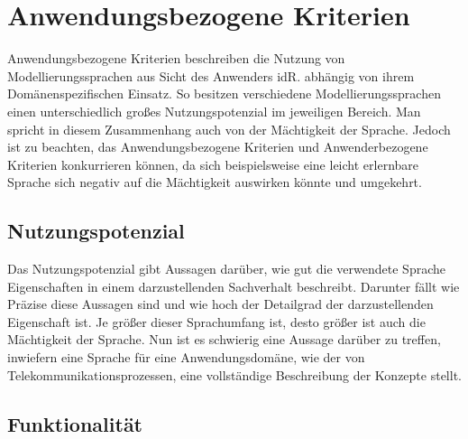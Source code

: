 \section{Anwendungsbezogene Kriterien}
\label{sc:AnwendungsbezogeneKriterien}
Anwendungsbezogene Kriterien beschreiben die Nutzung von Modellierungssprachen aus Sicht des Anwenders idR. abhängig 
von ihrem Domänenspezifischen Einsatz. So besitzen verschiedene Modellierungssprachen einen unterschiedlich großes 
Nutzungspotenzial im jeweiligen Bereich. Man spricht in diesem Zusammenhang auch von der Mächtigkeit der Sprache. 
Jedoch ist zu beachten, das Anwendungsbezogene Kriterien und Anwenderbezogene Kriterien konkurrieren können, 
da sich beispielsweise eine leicht erlernbare Sprache sich negativ auf die Mächtigkeit auswirken könnte und umgekehrt.

\subsection{Nutzungspotenzial}
\label{ssc:Nutzungspotenzial}
Das Nutzungspotenzial gibt Aussagen darüber, wie gut die verwendete Sprache Eigenschaften in einem darzustellenden Sachverhalt
beschreibt. Darunter fällt wie Präzise diese Aussagen sind und wie hoch der Detailgrad der darzustellenden Eigenschaft ist. 
Je größer dieser Sprachumfang ist, desto größer ist auch die Mächtigkeit der Sprache. Nun ist es schwierig eine Aussage darüber 
zu treffen, inwiefern eine Sprache für eine Anwendungsdomäne, wie der von Telekommunikationsprozessen, eine vollständige
Beschreibung der Konzepte stellt.

\subsection{Funktionalität}
\label{ssc:Funktionalität}
